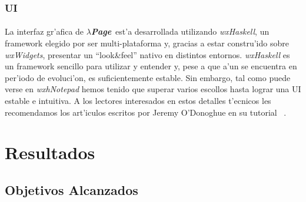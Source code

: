 \documentclass[a4paper]{article}
\newcommand{\hpage}{\textbf{\textsl{$\lambda$Page}}}
\begin{document}
\subsubsection{UI}
\paragraph{}La interfaz gr'afica de \hpage\ est'a desarrollada utilizando \textsl{wxHaskell}, un framework elegido por ser multi-plataforma y, gracias a estar constru'ido sobre \textsl{wxWidgets}, presentar un ``look\&feel'' nativo en distintos entornos.  \textsl{wxHaskell} es un framework sencillo para utilizar y entender y, pese a que a'un se encuentra en per'iodo de evoluci'on, es suficientemente estable.  Sin embargo, tal como puede verse en \textsl{wxhNotepad} hemos tenido que superar varios escollos hasta lograr una UI estable e intuitiva.  A los lectores interesados en estos detalles t'ecnicos les recomendamos los art'iculos escritos por Jeremy O'Donoghue en su tutorial ~\cite{wewantarock}.

\newpage
\section{Resultados}
\subsection{Objetivos Alcanzados}
\begin{epigraphs}
\end{epigraphs}
\end{document}
